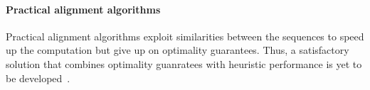 \paragraph{Practical alignment algorithms}
Practical alignment algorithms exploit similarities between the sequences to
speed up the computation but give up on optimality guarantees. Thus, a
satisfactory solution that combines optimality guanratees with heuristic
performance is yet to be developed~\citep{medvedev2022theoretical}.


